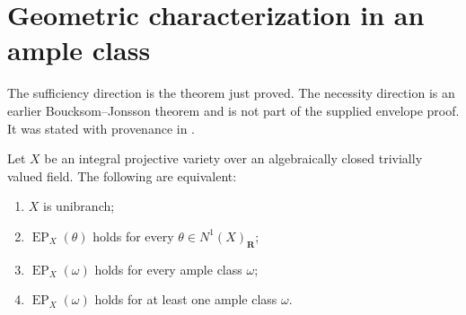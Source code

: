 \section{Geometric characterization in an ample class}
\label{sec:ch45-characterization}

The sufficiency direction is the theorem just proved.
The necessity direction is an earlier Boucksom--Jonsson theorem and is not
part of the supplied envelope proof.
It was stated with provenance in
.

\begin{theorem}\label{thm:bj-final-unibranch-characterization}
Let $X$ be an integral projective variety over an algebraically closed
trivially valued field.
The following are equivalent:
\begin{enumerate}
\item $X$ is unibranch;
\item $\operatorname{EP}_X(\theta)$ holds for every
      $\theta\in N^1(X)_{\mathbf R}$;
\item $\operatorname{EP}_X(\omega)$ holds for every ample class $\omega$;
\item $\operatorname{EP}_X(\omega)$ holds for at least one ample class
      $\omega$.
\end{enumerate}
\par
\end{theorem}


